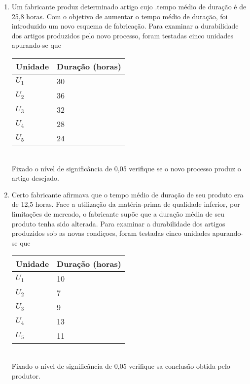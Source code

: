 \begin{enumerate}[resume]
\item Um fabricante produz determinado artigo cujo .tempo médio de duração é de 25,8 horas. Com o objetivo de aumentar o tempo médio de duração, foi introduzido um novo esquema de fabricação. Para examinar a durabilidade dos artigos produzidos pelo novo processo, foram testadas cinco unidades apurando-se que\\
	\begin{table}[!htb]
	\centering
	\begin{tabular}{ll}
	Unidade & Duração (horas) \\
	\hline 
	$U_{1}$ & 30  \\
	$U_{2}$ & 36 \\
	$U_{3}$ & 32 \\
	$U_{4}$ & 28  \\
	$U_{5}$ & 24  \\
	\end{tabular}
	\end{table}\\
Fixado o nível de significância de 0,05 verifique se o novo processo produz o artigo desejado.

\item Certo fabricante afirmava que o tempo médio de duração de seu produto era de 12,5 horas. Face a utilização da matéria-prima de qualidade inferior, por limitações de mercado, o fabricante supõe que a duração média de seu produto tenha sido alterada. Para examinar a durabilidade dos artigos produzidos sob as novas condiçoes, foram testadas cinco unidades apurando-se que\\
	\begin{table}[!htb]
	\centering
	\begin{tabular}{ll}
	Unidade & Duração (horas) \\
	\hline 
	$U_{1}$ & 10  \\
	$U_{2}$ & 7 \\
	$U_{3}$ & 9 \\
	$U_{4}$ & 13  \\
	$U_{5}$ & 11  \\
	\end{tabular}
	\end{table}\\
Fixado o nível de significância de 0,05 verifique sa conclusão obtida pelo produtor. 

\end{enumerate}